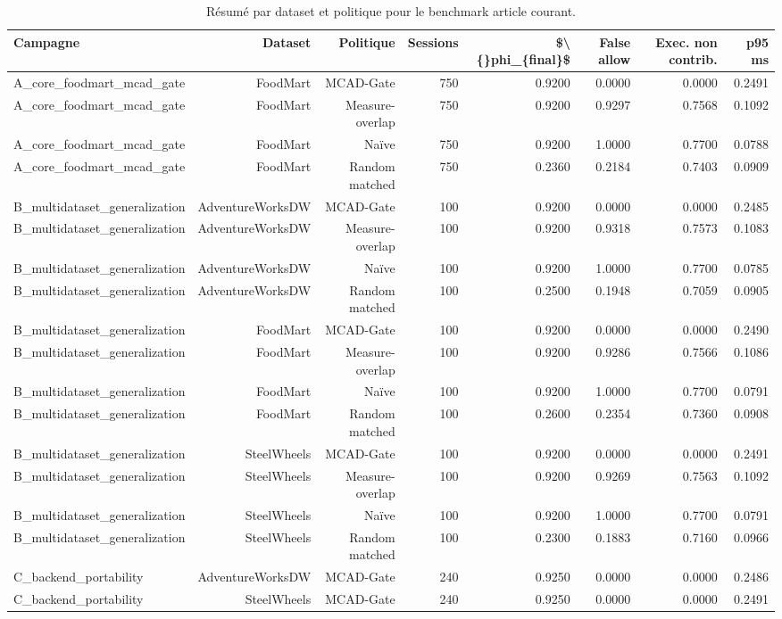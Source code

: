 \begin{table}[!t]
\centering
\caption{Résumé par dataset et politique pour le benchmark article courant.}
\scriptsize
\setlength{\tabcolsep}{4pt}
\begin{tabular}{@{}lrrrrrrr@{}}
\toprule
Campagne & Dataset & Politique & Sessions & \$\textbackslash\{\}phi\_\{final\}\$ & False allow & Exec. non contrib. & p95 ms \\
\midrule
A\_core\_foodmart\_mcad\_gate & FoodMart & MCAD-Gate & 750 & 0.9200 & 0.0000 & 0.0000 & 0.2491 \\
A\_core\_foodmart\_mcad\_gate & FoodMart & Measure-overlap & 750 & 0.9200 & 0.9297 & 0.7568 & 0.1092 \\
A\_core\_foodmart\_mcad\_gate & FoodMart & Naïve & 750 & 0.9200 & 1.0000 & 0.7700 & 0.0788 \\
A\_core\_foodmart\_mcad\_gate & FoodMart & Random matched & 750 & 0.2360 & 0.2184 & 0.7403 & 0.0909 \\
B\_multidataset\_generalization & AdventureWorksDW & MCAD-Gate & 100 & 0.9200 & 0.0000 & 0.0000 & 0.2485 \\
B\_multidataset\_generalization & AdventureWorksDW & Measure-overlap & 100 & 0.9200 & 0.9318 & 0.7573 & 0.1083 \\
B\_multidataset\_generalization & AdventureWorksDW & Naïve & 100 & 0.9200 & 1.0000 & 0.7700 & 0.0785 \\
B\_multidataset\_generalization & AdventureWorksDW & Random matched & 100 & 0.2500 & 0.1948 & 0.7059 & 0.0905 \\
B\_multidataset\_generalization & FoodMart & MCAD-Gate & 100 & 0.9200 & 0.0000 & 0.0000 & 0.2490 \\
B\_multidataset\_generalization & FoodMart & Measure-overlap & 100 & 0.9200 & 0.9286 & 0.7566 & 0.1086 \\
B\_multidataset\_generalization & FoodMart & Naïve & 100 & 0.9200 & 1.0000 & 0.7700 & 0.0791 \\
B\_multidataset\_generalization & FoodMart & Random matched & 100 & 0.2600 & 0.2354 & 0.7360 & 0.0908 \\
B\_multidataset\_generalization & SteelWheels & MCAD-Gate & 100 & 0.9200 & 0.0000 & 0.0000 & 0.2491 \\
B\_multidataset\_generalization & SteelWheels & Measure-overlap & 100 & 0.9200 & 0.9269 & 0.7563 & 0.1092 \\
B\_multidataset\_generalization & SteelWheels & Naïve & 100 & 0.9200 & 1.0000 & 0.7700 & 0.0791 \\
B\_multidataset\_generalization & SteelWheels & Random matched & 100 & 0.2300 & 0.1883 & 0.7160 & 0.0966 \\
C\_backend\_portability & AdventureWorksDW & MCAD-Gate & 240 & 0.9250 & 0.0000 & 0.0000 & 0.2486 \\
C\_backend\_portability & SteelWheels & MCAD-Gate & 240 & 0.9250 & 0.0000 & 0.0000 & 0.2491 \\
\bottomrule
\end{tabular}
\normalsize
\label{tab:dataset-results}
\end{table}
